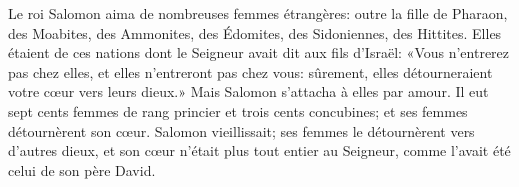 Le roi Salomon aima de nombreuses femmes étrangères:
	outre la fille de Pharaon, des Moabites, des Ammonites,
	des Édomites, des Sidoniennes, des Hittites.
Elles étaient de ces nations dont le Seigneur avait dit aux fils d’Israël:
	«Vous n’entrerez pas chez elles, et elles n’entreront pas chez vous:
	sûrement, elles détourneraient votre cœur vers leurs dieux.»
Mais Salomon s’attacha à elles par amour.
Il eut sept cents femmes de rang princier et trois cents concubines;
	et ses femmes détournèrent son cœur.
Salomon vieillissait; ses femmes le détournèrent vers d’autres dieux,
	et son cœur n’était plus tout entier au Seigneur,
	comme l’avait été celui de son père David.
